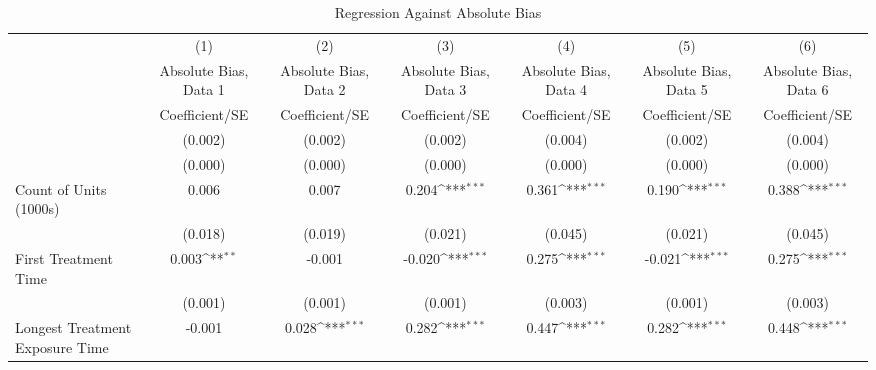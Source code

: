 \begin{table}[htbp]\centering
\def\sym#1{\ifmmode^{#1}\else\(^{#1}\)\fi}
\caption{Regression Against Absolute Bias}
\begin{tabular}{l*{6}{c}}
\hline\hline
                    &\multicolumn{1}{c}{(1)}&\multicolumn{1}{c}{(2)}&\multicolumn{1}{c}{(3)}&\multicolumn{1}{c}{(4)}&\multicolumn{1}{c}{(5)}&\multicolumn{1}{c}{(6)}\\
                    &\multicolumn{1}{c}{Absolute Bias, Data 1}&\multicolumn{1}{c}{Absolute Bias, Data 2}&\multicolumn{1}{c}{Absolute Bias, Data 3}&\multicolumn{1}{c}{Absolute Bias, Data 4}&\multicolumn{1}{c}{Absolute Bias, Data 5}&\multicolumn{1}{c}{Absolute Bias, Data 6}\\
                    &Coefficient/SE         &Coefficient/SE         &Coefficient/SE         &Coefficient/SE         &Coefficient/SE         &Coefficient/SE         \\
\hline
                    &     (0.002)         &     (0.002)         &     (0.002)         &     (0.004)         &     (0.002)         &     (0.004)         \\
                    &     (0.000)         &     (0.000)         &     (0.000)         &     (0.000)         &     (0.000)         &     (0.000)         \\
Count of Units (1000s)&       0.006         &       0.007         &       0.204\sym{***}&       0.361\sym{***}&       0.190\sym{***}&       0.388\sym{***}\\
                    &     (0.018)         &     (0.019)         &     (0.021)         &     (0.045)         &     (0.021)         &     (0.045)         \\
First Treatment Time&       0.003\sym{**} &      -0.001         &      -0.020\sym{***}&       0.275\sym{***}&      -0.021\sym{***}&       0.275\sym{***}\\
                    &     (0.001)         &     (0.001)         &     (0.001)         &     (0.003)         &     (0.001)         &     (0.003)         \\
Longest Treatment Exposure Time&      -0.001         &       0.028\sym{***}&       0.282\sym{***}&       0.447\sym{***}&       0.282\sym{***}&       0.448\sym{***}\\

\end{tabular}
\end{table}
